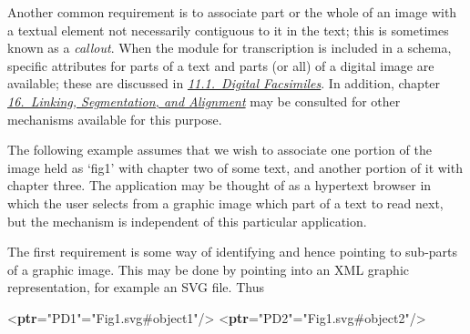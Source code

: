 Another common requirement is to associate part or the whole of an image with a textual element not necessarily contiguous to it in the text; this is sometimes known as a \textit{callout}. When the module for transcription is included in a schema, specific attributes for parts of a text and parts (or all) of a digital image are available; these are discussed in \textit{\hyperref[PHFAX]{11.1.\ Digital Facsimiles}}. In addition, chapter \textit{\hyperref[SA]{16.\ Linking, Segmentation, and Alignment}} may be consulted for other mechanisms available for this purpose.\par
The following example assumes that we wish to associate one portion of the image held as ‘fig1’ with chapter two of some text, and another portion of it with chapter three. The application may be thought of as a hypertext browser in which the user selects from a graphic image which part of a text to read next, but the mechanism is independent of this particular application.\par
The first requirement is some way of identifying and hence pointing to sub-parts of a graphic image. This may be done by pointing into an XML graphic representation, for example an SVG file. Thus \par\bgroup{}\exampleFont \begin{shaded}\noindent\mbox{}{<\textbf{ptr}\hspace*{1em}{xml:id}="{PD1}"\hspace*{1em}{target}="{Fig1.svg\#object1}"/>}\mbox{}\newline 
{<\textbf{ptr}\hspace*{1em}{xml:id}="{PD2}"\hspace*{1em}{target}="{Fig1.svg\#object2}"/>}\end{shaded}\egroup\par \par
